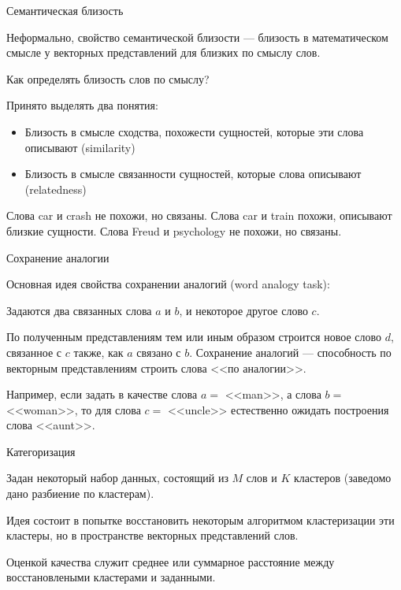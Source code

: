 \documentclass[9pt]{beamer}
\begin{document}
\begin{frame}{Семантическая близость}

Неформально, свойство семантической близости --- близость в математическом смысле у векторных представлений для близких по смыслу слов.

\vspace{\baselineskip}

Как определять близость слов по смыслу?

Принято выделять два понятия:
\begin{itemize}
    \item Близость в смысле сходства, похожести сущностей, которые эти слова описывают (similarity)
    \item Близость в смысле связанности сущностей, которые слова описывают (relatedness)
\end{itemize}

\vspace{\baselineskip}

Слова car и crash не похожи, но связаны. Слова car и train похожи, описывают близкие сущности. Слова Freud и psychology не похожи, но связаны.
    
\end{frame}

\begin{frame}{Сохранение аналогии}

Основная идея свойства сохранении аналогий (word analogy task): 

Задаются два связанных слова $a$ и $b$, и некоторое другое слово $c$. 
\vspace{\baselineskip}

По полученным представлениям тем или иным образом строится новое слово $d$, связанное с $c$ также, как $a$ связано с $b$. Сохранение аналогий ---  способность по векторным представлениям строить слова <<по аналогии>>. 
\vspace{\baselineskip}

Например, если задать в качестве слова $a=$ <<man>>, а слова $b=$ <<woman>>, то для слова $c=$ <<uncle>> естественно ожидать построения слова <<aunt>>.
    
\end{frame}

\begin{frame}{Категоризация}

Задан некоторый набор данных, состоящий из $M$ слов и $K$ кластеров (заведомо дано разбиение по кластерам). 

\vspace{\baselineskip}
Идея состоит в попытке восстановить некоторым алгоритмом кластеризации эти кластеры, но в пространстве векторных представлений слов.

\vspace{\baselineskip}
Оценкой качества служит среднее или суммарное расстояние между восстановлеными кластерами и заданными.
    
\end{frame}
\end{document}

